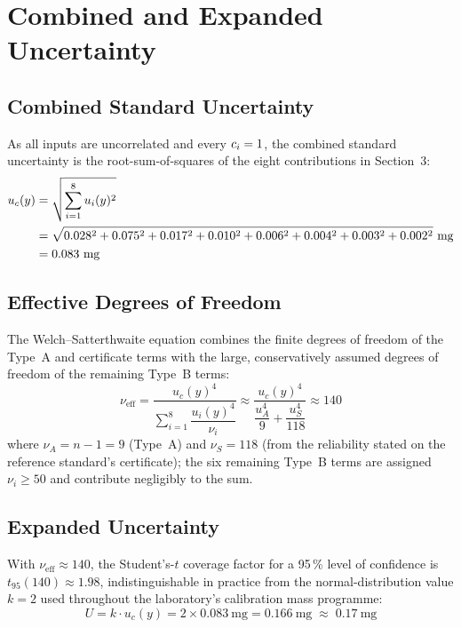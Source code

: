 \section{Combined and Expanded Uncertainty}

\subsection{Combined Standard Uncertainty}
As all inputs are uncorrelated and every $c_i = 1$, the combined standard
uncertainty is the root-sum-of-squares of the eight contributions in
Section~3:
\begin{align}
  u_c(y) &= \sqrt{\sum_{i=1}^{8} u_i(y)^2} \notag \\
  &= \sqrt{0.028^2 + 0.075^2 + 0.017^2 + 0.010^2 + 0.006^2 + 0.004^2 + 0.003^2 + 0.002^2}\ \text{mg} \notag \\
  &= 0.083\ \text{mg}
\end{align}

\subsection{Effective Degrees of Freedom}
The Welch--Satterthwaite equation combines the finite degrees of freedom of
the Type~A and certificate terms with the large, conservatively assumed
degrees of freedom of the remaining Type~B terms:
\begin{equation}
  \nu_{\mathrm{eff}} = \frac{u_c(y)^4}{\displaystyle\sum_{i=1}^{8} \dfrac{u_i(y)^4}{\nu_i}}
  \approx \frac{u_c(y)^4}{\dfrac{u_A^4}{9} + \dfrac{u_S^4}{118}}
  \approx 140
\end{equation}
where $\nu_A = n - 1 = 9$ (Type~A) and $\nu_S = 118$ (from the reliability
stated on the reference standard's certificate); the six remaining Type~B
terms are assigned $\nu_i \geq 50$ and contribute negligibly to the sum.

\subsection{Expanded Uncertainty}
With $\nu_{\mathrm{eff}} \approx 140$, the Student's-$t$ coverage factor for a
95\,\% level of confidence is $t_{95}(140) \approx 1.98$, indistinguishable in
practice from the normal-distribution value $k = 2$ used throughout the
laboratory's calibration mass programme:
\begin{equation}
  U = k \cdot u_c(y) = 2 \times 0.083\ \text{mg} = 0.166\ \text{mg} \;\approx\; 0.17\ \text{mg}
\end{equation}

